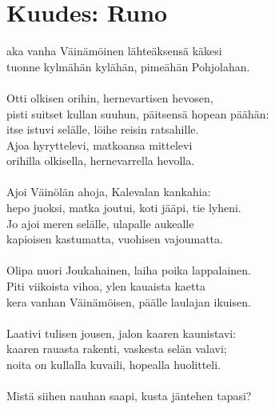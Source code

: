 
\chapter*{Kuudes: Runo}

aka vanha Väinämöinen lähteäksensä käkesi       \\
tuonne kylmähän kylähän, pimeähän Pohjolahan.               \\
                                                            \\
Otti olkisen orihin, hernevartisen hevosen,                 \\
pisti suitset kullan suuhun, päitsensä hopean päähän:       \\
itse istuvi selälle, löihe reisin ratsahille.               \\
Ajoa hyryttelevi, matkoansa mittelevi                       \\
orihilla olkisella, hernevarrella hevolla.                  \\
                                                            \\
Ajoi Väinölän ahoja, Kalevalan kankahia:                    \\
hepo juoksi, matka joutui, koti jääpi, tie lyheni.          \\
Jo ajoi meren selälle, ulapalle aukealle                    \\
kapioisen kastumatta, vuohisen vajoumatta.                  \\
                                                            \\
Olipa nuori Joukahainen, laiha poika lappalainen.           \\
Piti viikoista vihoa, ylen kauaista kaetta                  \\
kera vanhan Väinämöisen, päälle laulajan ikuisen.           \\
                                                            \\
Laativi tulisen jousen, jalon kaaren kaunistavi:            \\
kaaren rauasta rakenti, vaskesta selän valavi;              \\
noita on kullalla kuvaili, hopealla huolitteli.             \\
                                                            \\
Mistä siihen nauhan saapi, kusta jäntehen tapasi?           \\
